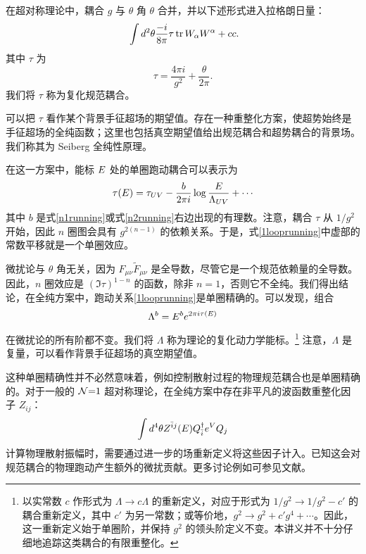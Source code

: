 在超对称理论中，耦合 $g$ 与 $\theta$ 角 $\theta$ 合并，并以下述形式进入拉格朗日量：
\begin{equation}
\ \int d^2\theta \frac{-i}{8\pi}\tau \mathop{\mathrm{tr}}\nolimits W_\alpha W^\alpha + cc.
\end{equation}
其中 $\tau$ 为
\begin{equation}
\tau=\frac{4\pi i}{g^2} +\frac{\theta}{2\pi}.
\end{equation}
我们将 $\tau$ 称为复化规范耦合。

可以把 $\tau$ 看作某个背景手征超场的期望值。存在一种重整化方案，使超势始终是手征超场的全纯函数；这里也包括真空期望值给出规范耦合和超势耦合的背景场\cite{Intriligator:1995au}。我们称其为 Seiberg 全纯性原理。

在这一方案中，能标 $E$ 处的单圈跑动耦合可以表示为
\begin{equation}
\tau(\LambdaRG )=\tau_{UV} - \frac{b}{2\pi i} \log\frac{\LambdaRG }{\Lambda_{UV}} + \cdots
\label{1looprunning}
\end{equation}
其中 $b$ 是式\eqref{n1running}或式\eqref{n2running}右边出现的有理数。注意，耦合 $\tau$ 从 $1/g^2$ 开始，因此 $n$ 圈图会具有 $g^{2(n-1)}$ 的依赖关系。于是，式\eqref{1looprunning}中虚部的常数平移就是一个单圈效应。

微扰论与 $\theta$ 角无关，因为 $F_{\mu\nu}\tilde F_{\mu\nu}$ 是全导数，尽管它是一个规范依赖量的全导数。因此，$n$ 圈效应是 $(\Im\tau)^{1-n}$ 的函数，除非 $n=1$，否则它不全纯。我们得出结论，在全纯方案中，跑动关系\eqref{1looprunning}是单圈精确的。可以发现，组合
\begin{equation}
\Lambda^b = E ^b e^{2\pi i  \tau(E )}
\end{equation}
在微扰论的所有阶都不变。我们将 $\Lambda$ 称为理论的复化动力学能标。\footnote{以实常数 $c$ 作形式为 $\Lambda\to c\Lambda$ 的重新定义，对应于形式为 $1/g^2\to1/g^2-c'$ 的耦合重新定义，其中 $c'$ 为另一常数；或等价地，$g^2\to g^2+c'g^4+\cdots$。因此，这一重新定义始于单圈阶，并保持 $g^2$ 的领头阶定义不变。本讲义并不十分仔细地追踪这类耦合的有限重整化。} 注意，$\Lambda$ 是复量，可以看作背景手征超场的真空期望值。

这种单圈精确性并不必然意味着，例如控制散射过程的物理规范耦合也是单圈精确的。对于一般的 $\mathcal{N}{=}1$ 超对称理论，在全纯方案中存在非平凡的波函数重整化因子 $Z_{ij}$：
\begin{equation}
\int d^4\theta Z^{\bar ij}(E ) Q^\dagger_{\bar i}  e^{V} Q_j \label{wr}
\end{equation}
计算物理散射振幅时，需要通过进一步的场重新定义将这些因子计入。已知这会对规范耦合的物理跑动产生额外的微扰贡献。更多讨论例如可参见文献\cite{ArkaniHamed:1997mj}。

